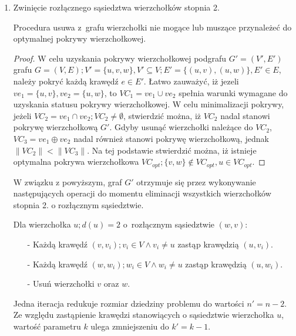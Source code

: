 \begin{enumerate}
  \item Zwinięcie rozłącznego sąsiedztwa wierzchołków stopnia 2.
    \begin{theorem}
      Procedura usuwa z~grafu wierzchołki nie mogące lub muszące przynależeć do 
      optymalnej pokrywy wierzchołkowej.
    \end{theorem}
    \begin{proof}
      W celu uzyskania pokrywy wierzchołkowej podgrafu $G\prime=(V\prime,E\prime)$
      grafu ${G=(V,E); V\prime=\{u, v, w\}, V\prime \subseteq V; E\prime=\{(u,v),
      (u,w)\}, E\prime \in E}$,
      należy pokryć każdą krawędź $e \in E\prime$. 
      Łatwo zauważyć, iż jezeli $ve_1=\{u,v\}, ve_2=\{u,w\}$, 
      to $VC_1=ve_1 \cup ve_2$ spełnia warunki wymagane do uzyskania statusu
      pokrywy wierzchołkowej.
      W celu minimalizacji pokrywy, jeżeli $VC_2=ve_1 \cap ve_2; VC_2 \neq \emptyset$,
      stwierdzić można, iż $VC_2$ nadal stanowi pokrywę wierzchołkową $G\prime$.
      Gdyby usunąć wierzchołki należące do $VC_2$, $VC_3=ve_1 \oplus ve_2$ nadal
      również stanowi pokrywę wierzchołkową, jednak $\|VC_2\| < \|VC_3\|$.
      Na tej podstawie stwierdzić można, iż istnieje optymalna pokrywa
      wierzchołkowa $VC_{opt}; \{v,w\} \notin VC_{opt}, u \in VC_{opt}$.
    \end{proof}

    W związku z powyższym, graf $G\prime$ otrzymuje się przez wykonywanie
    następujących operacji do momentu eliminacji wszystkich wierzchołków stopnia
    2. o rozłącznym sąsiedztwie.

    Dla wierzchołka $u; d(u)=2$ o~rozłącznym sąsiedztwie $(w,v)$:
    \begin{itemize}
      \item[-] Każdą krawędź $(v,v_i); v_i \in V \land v_i \neq u$ zastąp 
        krawędzią $(u, v_i)$.
      \item[-] Każdą krawędź $(w,w_i); w_i \in V \land w_i \neq u$ zastąp
        krawędzią $(u, w_i)$.
      \item[-] Usuń wierzchołki $v$ oraz $w$.
    \end{itemize}
    Jedna iteracja redukuje rozmiar dziedziny problemu do wartości
    $n\prime=n-2$.
    Ze względu zastąpienie krawędzi stanowiących o sąsiedztwie wierzchołka $u$,
    wartość parametru $k$ ulega zmniejszeniu do $k\prime=k-1$.

\end{enumerate}

